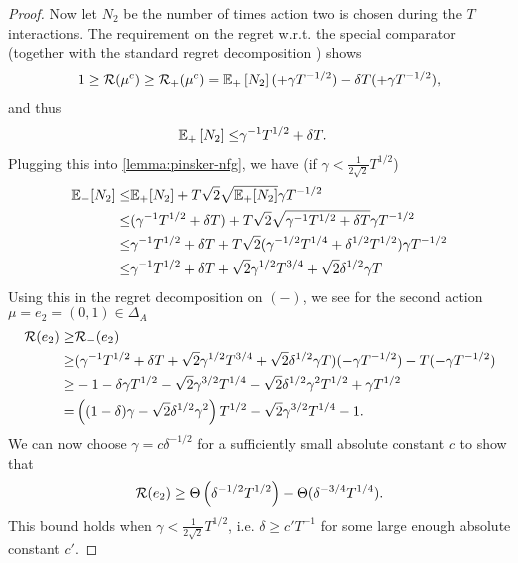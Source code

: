 \begin{proof}
    \noindent Now let $N_2$ be the number of times action two is chosen during the $T$ interactions. The requirement on the regret w.r.t. the special comparator (together with the standard regret decomposition \citep[Sec. 4.5]{lattimore2020bandit}) shows
    \begin{align*}
        1 \geq \mathcal{R}(\mu^c) \geq \mathcal{R}_+(\mu^c) = \mathbb{E}_+\left[ N_2 \right] (+\gamma T^{-1/2}) - \delta T (+\gamma T^{-1/2}),
    \end{align*}
    and thus
    \begin{align*}
        \mathbb{E}_+\left[ N_2 \right] \leq& \gamma^{-1}T^{1/2} + \delta T. 
    \end{align*}
    Plugging this into \cref{lemma:pinsker-nfg}, we have (if $\gamma < \frac{1}{2\sqrt{2}}T^{1/2}$)
    \begin{align*}
        \mathbb{E}_-[N_2] \leq& \mathbb{E}_+[N_2] + T \sqrt{2}\sqrt{\mathbb{E}_+[N_2]} \gamma T^{-1/2}\nonumber\\
        \leq& (\gamma^{-1}T^{1/2} + \delta T) + T \sqrt{2} \sqrt{\gamma^{-1}T^{1/2} + \delta T} \gamma T^{-1/2}\nonumber\\
        \leq& \gamma^{-1}T^{1/2} + \delta T + T \sqrt{2}(\gamma^{-1/2}T^{1/4} + \delta^{1/2} T^{1/2}) \gamma T^{-1/2}\nonumber\\
        \leq& \gamma^{-1}T^{1/2} + \delta T + \sqrt{2}\gamma^{1/2}T^{3/4} + \sqrt{2}\delta^{1/2} \gamma T 
    \end{align*}
    Using this in the regret decomposition on $(-)$, we see for the second action $\mu=e_2=(0,1)\in\Delta_A$
    \begin{align*}
        \mathcal{R}(e_2) \geq& \mathcal{R}_-(e_2)\\
        \geq& (\gamma^{-1}T^{1/2} + \delta T + \sqrt{2}\gamma^{1/2}T^{3/4} + \sqrt{2}\delta^{1/2} \gamma T) (-\gamma T^{-1/2}) - T(-\gamma T^{-1/2})\\
        \geq& - 1 - \delta \gamma T^{1/2} - \sqrt{2}\gamma^{3/2}T^{1/4} - \sqrt{2}\delta^{1/2} \gamma^2 T^{1/2} + \gamma T^{1/2}\\
        =& \left( (1-\delta)\gamma - \sqrt{2}\delta^{1/2}\gamma^2 \right) T^{1/2} - \sqrt{2}\gamma^{3/2}T^{1/4}-1.
    \end{align*}
    We can now choose $\gamma = c \delta^{-1/2}$ for a sufficiently small absolute constant $c$ to show that 
    \begin{align}
        \mathcal{R}(e_2) \geq \Theta\left(  \delta^{-1/2} T^{1/2} \right) - \Theta(\delta^{-3/4}T^{1/4}). \label{eq:lower}
    \end{align}
    This bound holds when $\gamma < \frac{1}{2\sqrt{2}} T^{1/2}$, i.e. $\delta \geq c' T^{-1}$ for some large enough absolute constant $c'$.
\end{proof}

